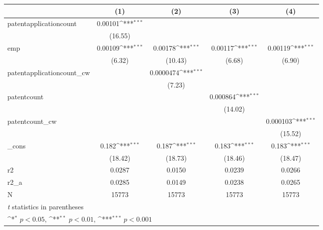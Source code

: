 {
\def\sym#1{\ifmmode^{#1}\else\(^{#1}\)\fi}
\begin{tabular}{l*{4}{c}}
\hline\hline
            &\multicolumn{1}{c}{(1)}         &\multicolumn{1}{c}{(2)}         &\multicolumn{1}{c}{(3)}         &\multicolumn{1}{c}{(4)}         \\
\hline
patentapplicationcount&     0.00101\sym{***}&                     &                     &                     \\
            &     (16.55)         &                     &                     &                     \\
[1em]
emp         &     0.00109\sym{***}&     0.00178\sym{***}&     0.00117\sym{***}&     0.00119\sym{***}\\
            &      (6.32)         &     (10.43)         &      (6.68)         &      (6.90)         \\
[1em]
patentapplicationcount\_cw&                     &   0.0000474\sym{***}&                     &                     \\
            &                     &      (7.23)         &                     &                     \\
[1em]
patentcount &                     &                     &    0.000864\sym{***}&                     \\
            &                     &                     &     (14.02)         &                     \\
[1em]
patentcount\_cw&                     &                     &                     &    0.000103\sym{***}\\
            &                     &                     &                     &     (15.52)         \\
[1em]
\_cons      &       0.182\sym{***}&       0.187\sym{***}&       0.183\sym{***}&       0.183\sym{***}\\
            &     (18.42)         &     (18.73)         &     (18.46)         &     (18.47)         \\
\hline
r2          &      0.0287         &      0.0150         &      0.0239         &      0.0266         \\
r2\_a        &      0.0285         &      0.0149         &      0.0238         &      0.0265         \\
N           &       15773         &       15773         &       15773         &       15773         \\
\hline\hline
\multicolumn{5}{l}{\footnotesize \textit{t} statistics in parentheses}\\
\multicolumn{5}{l}{\footnotesize \sym{*} \(p<0.05\), \sym{**} \(p<0.01\), \sym{***} \(p<0.001\)}\\
\end{tabular}
}
